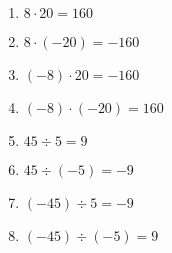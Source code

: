   \begin{multicols}{2}
  \begin{enumerate}[1)]
   \item $8 \cdot 20= 160$
   \item $8 \cdot (-20)= -160$
   \item $(-8) \cdot 20= -160$
   \item $(-8) \cdot (-20)= 160$
   \item $45 \div 5= 9$
   \item $45 \div (-5)= -9$
   \item $(-45) \div 5= -9$
   \item $(-45) \div (-5)= 9$
  \end{enumerate}
  \end{multicols}







